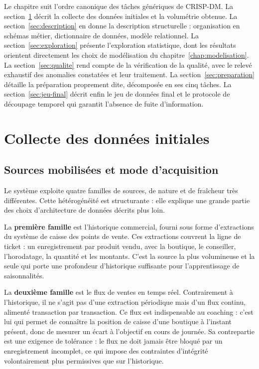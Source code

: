 Le chapitre suit l'ordre canonique des tâches génériques de CRISP-DM. La section~\ref{sec:collecte} décrit la collecte des données initiales et la volumétrie obtenue. La section~\ref{sec:description} en donne la description structurelle : organisation en schémas métier, dictionnaire de données, modèle relationnel. La section~\ref{sec:exploration} présente l'exploration statistique, dont les résultats orientent directement les choix de modélisation du chapitre~\ref{chap:modelisation}. La section~\ref{sec:qualite} rend compte de la vérification de la qualité, avec le relevé exhaustif des anomalies constatées et leur traitement. La section~\ref{sec:preparation} détaille la préparation proprement dite, décomposée en ses cinq tâches. La section~\ref{sec:jeu-final} décrit enfin le jeu de données final et le protocole de découpage temporel qui garantit l'absence de fuite d'information.

\section{Collecte des données initiales}
\label{sec:collecte}

\subsection{Sources mobilisées et mode d'acquisition}

Le système exploite quatre familles de sources, de nature et de fraîcheur très différentes. Cette hétérogénéité est structurante : elle explique une grande partie des choix d'architecture de données décrits plus loin.

La \textbf{première famille} est l'historique commercial, fourni sous forme d'extractions du système de caisse des points de vente. Ces extractions couvrent la ligne de ticket : un enregistrement par produit vendu, avec la boutique, le conseiller, l'horodatage, la quantité et les montants. C'est la source la plus volumineuse et la seule qui porte une profondeur d'historique suffisante pour l'apprentissage de saisonnalités.

La \textbf{deuxième famille} est le flux de ventes en temps réel. Contrairement à l'historique, il ne s'agit pas d'une extraction périodique mais d'un flux continu, alimenté transaction par transaction. Ce flux est indispensable au coaching : c'est lui qui permet de connaître la position de caisse d'une boutique à l'instant présent, donc de mesurer un écart à l'objectif en cours de journée. Sa contrepartie est une exigence de tolérance : le flux ne doit jamais être bloqué par un enregistrement incomplet, ce qui impose des contraintes d'intégrité volontairement plus permissives que sur l'historique.

